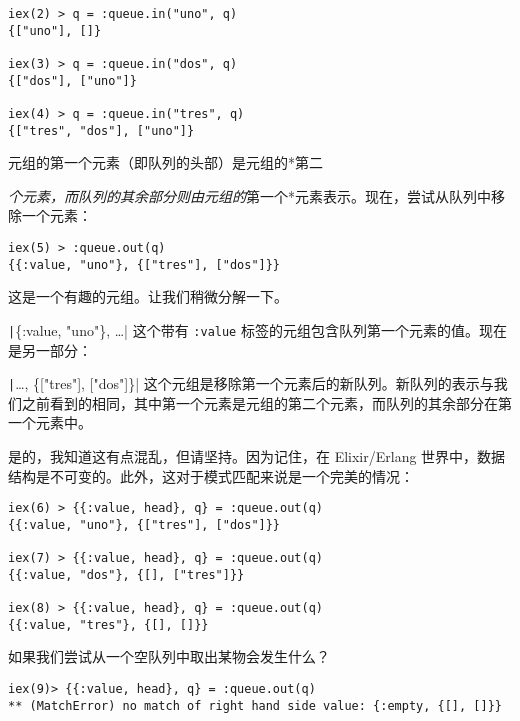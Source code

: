 \begin{code}{}
\begin{verbatim}
iex(2) > q = :queue.in("uno", q)
{["uno"], []}

iex(3) > q = :queue.in("dos", q)
{["dos"], ["uno"]}

iex(4) > q = :queue.in("tres", q)
{["tres", "dos"], ["uno"]}
\end{verbatim}
\end{code}

元组的第一个元素（即队列的头部）是元组的*第二

\emph{个元素，而队列的其余部分则由元组的}第一个*元素表示。现在，尝试从队列中移除一个元素：

\begin{code}{}
\begin{verbatim}
iex(5) > :queue.out(q)
{{:value, "uno"}, {["tres"], ["dos"]}}
\end{verbatim}
\end{code}

这是一个有趣的元组。让我们稍微分解一下。

\texttt|{\{:value, "uno"\}, …}| 这个带有
\texttt{:value}
标签的元组包含队列第一个元素的值。现在是另一部分：

\texttt|{…, \{["tres"], ["dos"]\}}|
这个元组是移除第一个元素后的新队列。新队列的表示与我们之前看到的相同，其中第一个元素是元组的第二个元素，而队列的其余部分在第一个元素中。

是的，我知道这有点混乱，但请坚持。因为记住，在 Elixir/Erlang
世界中，数据结构是不可变的。此外，这对于模式匹配来说是一个完美的情况：

\begin{code}{}
\begin{verbatim}
iex(6) > {{:value, head}, q} = :queue.out(q)
{{:value, "uno"}, {["tres"], ["dos"]}}

iex(7) > {{:value, head}, q} = :queue.out(q)
{{:value, "dos"}, {[], ["tres"]}}

iex(8) > {{:value, head}, q} = :queue.out(q)
{{:value, "tres"}, {[], []}}
\end{verbatim}
\end{code}

如果我们尝试从一个空队列中取出某物会发生什么？

\begin{code}{}
\begin{verbatim}
iex(9)> {{:value, head}, q} = :queue.out(q)
** (MatchError) no match of right hand side value: {:empty, {[], []}}
\end{verbatim}
\end{code}

